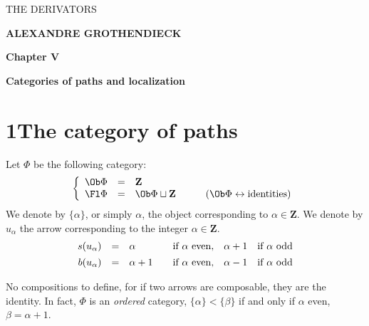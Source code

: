\printedpage{}

\begin{center}
\vspace*{6cm}

{\LARGE\textsf{THE DERIVATORS}}

\vspace{1.5cm}

{\large\textbf{ALEXANDRE GROTHENDIECK}}

\vspace{2.5cm}

{\large\textbf{Chapter V}}

\vspace{0.4cm}

{\large\textbf{Categories of paths and localization}}
\end{center}

\clearpage

\printedpage{}

\vspace*{6cm}


\clearpage



\section*{1\quad The category of paths}

Let $\Phi$ be the following category:
\[
\left\{
\begin{array}{rcll}
\Ob\Phi & = & \mathbf{Z} & \\
\Fl\Phi & = & \Ob\Phi\sqcup\mathbf{Z} & \qquad (\Ob\Phi\leftrightarrow\text{identities})
\end{array}
\right.
\]
We denote by $\{\alpha\}$, or simply $\alpha$, the object corresponding to $\alpha\in\mathbf{Z}$. We denote by $u_\alpha$ the arrow corresponding to the integer $\alpha\in\mathbf{Z}$.
\[
\begin{array}{rcl@{\qquad}l@{\quad}l@{\quad}l}
s(u_\alpha) & = & \alpha & \text{if } \alpha \text{ even}, & \alpha+1 & \text{if } \alpha \text{ odd}\\[1ex]
b(u_\alpha) & = & \alpha+1 & \text{if } \alpha \text{ even}, & \alpha-1 & \text{if } \alpha \text{ odd}
\end{array}
\]


No compositions to define, for if two arrows are composable, they are the identity. In fact, $\Phi$ is an \textit{ordered} category, $\{\alpha\}<\{\beta\}$ if and only if $\alpha$ even, $\beta=\alpha+1$. %

